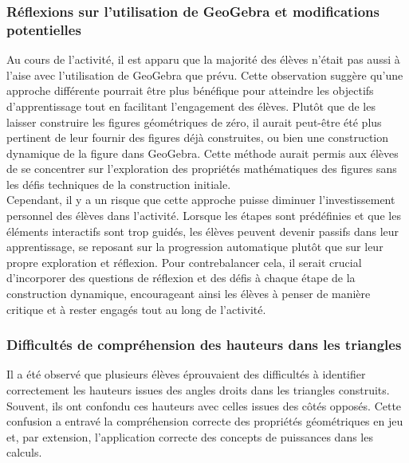 \subsubsection{Réflexions sur l'utilisation de GeoGebra et modifications potentielles}

Au cours de l'activité,
il est apparu que la majorité des élèves n'était pas aussi à l'aise avec l'utilisation de GeoGebra que prévu.
Cette observation suggère qu'une approche différente pourrait être plus bénéfique pour atteindre les objectifs d'apprentissage tout en facilitant l'engagement des élèves.
Plutôt que de les laisser construire les figures géométriques de zéro,
il aurait peut-être été plus pertinent de leur fournir des figures déjà construites,
ou bien une construction dynamique de la figure dans GeoGebra.
Cette méthode aurait permis aux élèves de se concentrer sur l'exploration des propriétés mathématiques des figures sans les défis techniques de la construction initiale.\\

Cependant,
il y a un risque que cette approche puisse diminuer l'investissement personnel des élèves dans l'activité.
Lorsque les étapes sont prédéfinies et que les éléments interactifs sont trop guidés,
les élèves peuvent devenir passifs dans leur apprentissage,
se reposant sur la progression automatique plutôt que sur leur propre exploration et réflexion.
Pour contrebalancer cela,
il serait crucial d'incorporer des questions de réflexion et des défis à chaque étape de la construction dynamique,
encourageant ainsi les élèves à penser de manière critique et à rester engagés tout au long de l'activité.\\

\subsubsection{Difficultés de compréhension des hauteurs dans les triangles}

Il a été observé que plusieurs élèves éprouvaient des difficultés à identifier correctement les hauteurs issues des angles droits dans les triangles construits.
Souvent,
ils ont confondu ces hauteurs avec celles issues des côtés opposés.
Cette confusion a entravé la compréhension correcte des propriétés géométriques en jeu et,
par extension,
l'application correcte des concepts de puissances dans les calculs.

\vspace*{0.5cm}

